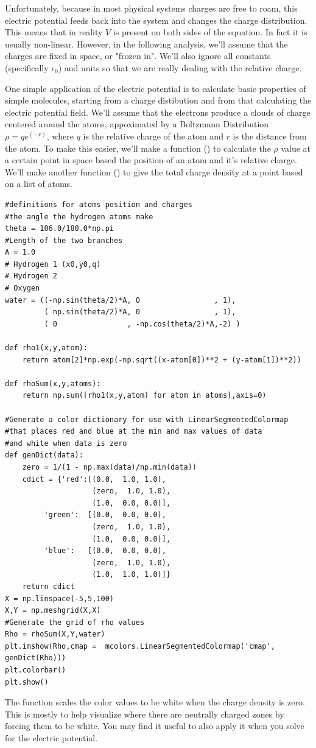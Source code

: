 Unfortunately, because in most physical systems charges are free to roam, this electric potential feeds back into the system and changes the charge distribution. 
This means that in reality $V$ is present on both sides of the equation.
In fact it is usually non-linear. 
However, in the following analysis, we'll assume that the charges are fixed in space, or "frozen in".
We'll also ignore all constants (specifically $\epsilon_0$) and units so that we are really dealing with the relative charge.

One simple application of the electric potential is to calculate basic properties of simple molecules, starting from a charge distibution and from that calculating the electric potential field.
We'll assume that the electrons produce a clouds of charge centered around the atoms, appoximated by a Boltzmann Distribution $\rho = q e^(-r)$, where $q$ is the relative charge of the atom and $r$ is the distance from the atom. 
To make this easier, we'll make a function () to calculate the $\rho$ value at a certain point in space based the position of an atom and it's relative charge. 
We'll make another function () to give the total charge density at a point based on a list of atoms.

\begin{lstlisting}
#definitions for atoms position and charges
#the angle the hydrogen atoms make
theta = 106.0/180.0*np.pi
#Length of the two branches
A = 1.0
# Hydrogen 1 (x0,y0,q)
# Hydrogen 2 
# Oxygen
water = ((-np.sin(theta/2)*A, 0					, 1),
         ( np.sin(theta/2)*A, 0				 	, 1),
         ( 0				, -np.cos(theta/2)*A,-2) )

def rho1(x,y,atom):
    return atom[2]*np.exp(-np.sqrt((x-atom[0])**2 + (y-atom[1])**2))

def rhoSum(x,y,atoms):
    return np.sum([rho1(x,y,atom) for atom in atoms],axis=0)

#Generate a color dictionary for use with LinearSegmentedColormap
#that places red and blue at the min and max values of data
#and white when data is zero
def genDict(data):
    zero = 1/(1 - np.max(data)/np.min(data))
    cdict = {'red':[(0.0,  1.0, 1.0),
                   	(zero,  1.0, 1.0),
                   	(1.0,  0.0, 0.0)],
         'green':  [(0.0,  0.0, 0.0),
                   	(zero,  1.0, 1.0),
                   	(1.0,  0.0, 0.0)],
         'blue':   [(0.0,  0.0, 0.0),
                   	(zero,  1.0, 1.0),
                   	(1.0,  1.0, 1.0)]}
    return cdict
X = np.linspace(-5,5,100)
X,Y = np.meshgrid(X,X)
#Generate the grid of rho values
Rho = rhoSum(X,Y,water)
plt.imshow(Rho,cmap =  mcolors.LinearSegmentedColormap('cmap', genDict(Rho)))
plt.colorbar()
plt.show()
\end{lstlisting}
The function  scales the color values to be white when the charge density is zero. This is mostly to help visualize where there are neutrally charged zones by forcing them to be white. You may find it useful to also apply it when you solve for the electric  potential.

